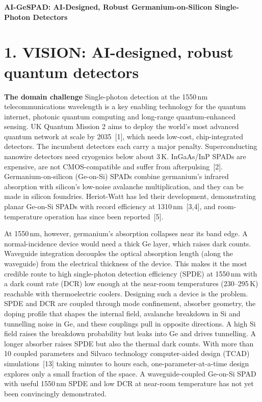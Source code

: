 \documentclass[11pt,a4paper]{article}
\newcommand{\cn}[1]{\textcolor{citeblue}{[#1]}}
\begin{document}
\begin{center}
{\large\bfseries AI-GeSPAD: AI-Designed, Robust Germanium-on-Silicon Single-Photon Detectors}\\[2pt]
\end{center}

\section{1. VISION: AI-designed, robust quantum detectors}

\textbf{The domain challenge}
Single-photon detection at the 1550\,nm telecommunications wavelength is a key enabling technology for the quantum internet, photonic quantum computing and long-range quantum-enhanced sensing. UK Quantum Mission 2 aims to deploy the world's most advanced quantum network at scale by 2035~\cn{1}, which needs low-cost, chip-integrated detectors. The incumbent detectors each carry a major penalty. Superconducting nanowire detectors need cryogenics below about 3\,K. InGaAs/InP SPADs are expensive, are not CMOS-compatible and suffer from afterpulsing~\cn{2}. Germanium-on-silicon (Ge-on-Si) SPADs combine germanium's infrared absorption with silicon's low-noise avalanche multiplication, and they can be made in silicon foundries. Heriot-Watt has led their development, demonstrating planar Ge-on-Si SPADs with record efficiency at 1310\,nm~\cn{3,4}, and room-temperature operation has since been reported~\cn{5}. 

At 1550\,nm, however, germanium's absorption collapses near its band edge. A normal-incidence device would need a thick Ge layer, which raises dark counts. Waveguide integration decouples the optical absorption length (along the waveguide) from the electrical thickness of the device. This makes it the most credible route to high single-photon detection efficiency (SPDE) at 1550\,nm with a dark count rate (DCR) low enough at the near-room temperatures (230--295\,K) reachable with thermoelectric coolers. Designing such a device is the problem. SPDE and DCR are coupled through mode confinement, absorber geometry, the doping profile that shapes the internal field, avalanche breakdown in Si and tunnelling noise in Ge, and these couplings pull in opposite directions. A high Si field raises the breakdown probability but leaks into Ge and drives tunnelling. A longer absorber raises SPDE but also the thermal dark counts. With more than 10 coupled parameters and Silvaco technology computer-aided design (TCAD) simulations~\cn{13} taking minutes to hours each, one-parameter-at-a-time design explores only a small fraction of the space. A waveguide-coupled Ge-on-Si SPAD with useful 1550\,nm SPDE and low DCR at near-room temperature has not yet been convincingly demonstrated. 
\end{document}
